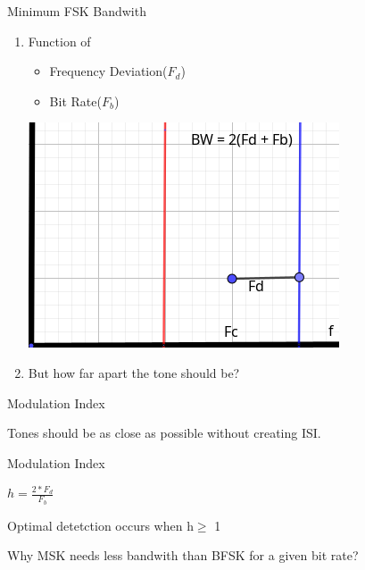 \documentclass{beamer}
\begin{document}
	
	\begin{frame}{Minimum FSK Bandwith}
		\begin{enumerate}
			\onslide\item<1-> Function of
			\begin{itemize}
				\item Frequency Deviation($F_d$)
				\item Bit Rate($F_b$)
			\end{itemize}
			\begin{center}
				\includegraphics[scale=0.6]{14.png}
			\end{center}
			\onslide\item<2-> But how far apart the tone should be?  
			
		\end{enumerate}
	\end{frame}
	
	\begin{frame}{Modulation Index}
		\begin{enumerate}
			\onslide\item<1-> Tones should be as close as possible without creating ISI.
			\onslide\item<2-> Modulation Index			
			\begin{center}
				\item $h = \frac{2*F_d}{F_b}$
				\item       
			\end{center}
			
			\onslide\item<3-> Optimal detetction occurs when h$\geq$ 1  
			\onslide\item<4-> Why MSK needs less bandwith than BFSK for a given bit rate? 
		\end{enumerate}
	\end{frame}
	
\end{document}
